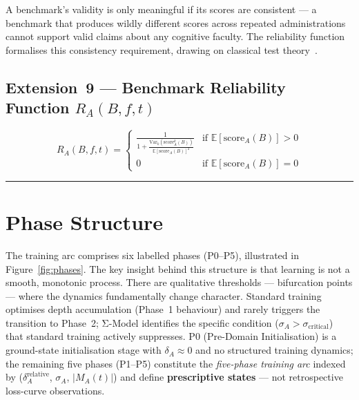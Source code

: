\documentclass[10pt]{article}
\begin{document}
A benchmark's validity is only meaningful if its scores are consistent --- a benchmark that produces wildly different scores across repeated administrations cannot support valid claims about any cognitive faculty. The reliability function formalises this consistency requirement, drawing on classical test theory~\citep{crocker1986introduction}.

\subsection{Extension~9 --- Benchmark Reliability Function \texorpdfstring{$R_A(B,f,t)$}{R\_A(B,f,t)}}\label{sec:reliability-fn}

\begin{equation}\label{eq:reliability}
R_A(B,f,t) = \begin{cases} \displaystyle\frac{1}{1 + \frac{\text{Var}_k(\text{score}_A^k(B))}{\mathbb{E}[\text{score}_A(B)]^2}} & \text{if } \mathbb{E}[\text{score}_A(B)] > 0 \\[8pt] 0 & \text{if } \mathbb{E}[\text{score}_A(B)] = 0 \end{cases}
\end{equation}

\noindent\rule{\linewidth}{0.4pt}

\section{Phase Structure}\label{sec:phase-structure}

The training arc comprises six labelled phases (P0--P5), illustrated in Figure~\ref{fig:phases}. The key insight behind this structure is that learning is not a smooth, monotonic process. There are qualitative thresholds --- bifurcation points --- where the dynamics fundamentally change character. Standard training optimises depth accumulation (Phase~1 behaviour) and rarely triggers the transition to Phase~2; Σ-Model identifies the specific condition ($\sigma_A > \sigma_{\text{critical}}$) that standard training actively suppresses. P0
(Pre-Domain Initialisation) is a ground-state initialisation stage
with $\delta_A \approx 0$ and no structured training dynamics; the
remaining five phases (P1--P5) constitute the \emph{five-phase
training arc} indexed by
($\delta_A^{\text{relative}}$, $\sigma_A$, $|M_A(t)|$) and define
\textbf{prescriptive states} --- not retrospective loss-curve
observations.
\end{document}
